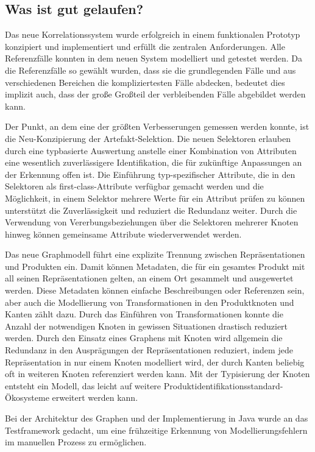 \subsection{Was ist gut gelaufen?}\label{subsec:discussion-positive}

Das neue Korrelationssystem wurde erfolgreich in einem funktionalen Prototyp konzipiert und implementiert und erfüllt die zentralen Anforderungen.
Alle Referenzfälle konnten in dem neuen System modelliert und getestet werden.
Da die Referenzfälle so gewählt wurden, dass sie die grundlegenden Fälle und aus verschiedenen Bereichen die kompliziertesten Fälle abdecken, bedeutet dies implizit auch, dass der große Großteil der verbleibenden Fälle abgebildet werden kann.

Der Punkt, an dem eine der größten Verbesserungen gemessen werden konnte, ist die Neu-Konzipierung der Artefakt-Selektion.
Die neuen Selektoren erlauben durch eine typbasierte Auswertung anstelle einer Kombination von Attributen eine wesentlich zuverlässigere Identifikation, die für zukünftige Anpassungen an der Erkennung offen ist.
Die Einführung typ-spezifischer Attribute, die in den Selektoren als first-class-Attribute verfügbar gemacht werden und die Möglichkeit, in einem Selektor mehrere Werte für ein Attribut prüfen zu können unterstützt die Zuverlässigkeit und reduziert die Redundanz weiter.
Durch die Verwendung von Vererbungsbeziehungen über die Selektoren mehrerer Knoten hinweg können gemeinsame Attribute wiederverwendet werden.

Das neue Graphmodell führt eine explizite Trennung zwischen Repräsentationen und Produkten ein.
Damit können Metadaten, die für ein gesamtes Produkt mit all seinen Repräsentationen gelten, an einem Ort gesammelt und ausgewertet werden.
Diese Metadaten können einfache Beschreibungen oder Referenzen sein, aber auch die Modellierung von Transformationen in den Produktknoten und Kanten zählt dazu.
Durch das Einführen von Transformationen konnte die Anzahl der notwendigen Knoten in gewissen Situationen drastisch reduziert werden.
Durch den Einsatz eines Graphens mit Knoten wird allgemein die Redundanz in den Ausprägungen der Repräsentationen reduziert, indem jede Repräsentation in nur einem Knoten modelliert wird, der durch Kanten beliebig oft in weiteren Knoten referenziert werden kann.
Mit der Typisierung der Knoten entsteht ein Modell, das leicht auf weitere Produktidentifikationsstandard-Ökosysteme erweitert werden kann.

Bei der Architektur des Graphen und der Implementierung in Java wurde an das Testframework gedacht, um eine frühzeitige Erkennung von Modellierungsfehlern im manuellen Prozess zu ermöglichen.

